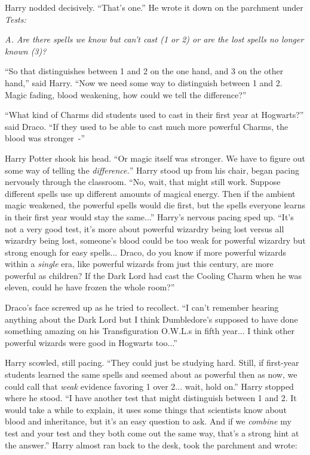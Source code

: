 Harry nodded decisively. ``That's one.'' He wrote it down on the parchment under \emph{Tests:}

\emph{A. Are there spells we know but can't cast (1 or 2) or are the lost spells no longer known (3)?}

``So that distinguishes between 1 and 2 on the one hand, and 3 on the other hand,'' said Harry. ``Now we need some way to distinguish between 1 and 2. Magic fading, blood weakening, how could we tell the difference?''

``What kind of Charms did students used to cast in their first year at Hogwarts?'' said Draco. ``If they used to be able to cast much more powerful Charms, the blood was stronger~-''

Harry Potter shook his head. ``Or magic itself was stronger. We have to figure out some way of telling the \emph{difference.}'' Harry stood up from his chair, began pacing nervously through the classroom. ``No, wait, that might still work. Suppose different spells use up different amounts of magical energy. Then if the ambient magic weakened, the powerful spells would die first, but the spells everyone learns in their first year would stay the same...'' Harry's nervous pacing sped up. ``It's not a very good test, it's more about powerful wizardry being lost versus all wizardry being lost, someone's blood could be too weak for powerful wizardry but strong enough for easy spells... Draco, do you know if more powerful wizards within a \emph{single} era, like powerful wizards from just this century, are more powerful as children? If the Dark Lord had cast the Cooling Charm when he was eleven, could he have frozen the whole room?''

Draco's face screwed up as he tried to recollect. ``I can't remember hearing anything about the Dark Lord but I think Dumbledore's supposed to have done something amazing on his Transfiguration O.W.L.s in fifth year... I think other powerful wizards were good in Hogwarts too...''

Harry scowled, still pacing. ``They could just be studying hard. Still, if first-year students learned the same spells and seemed about as powerful then as now, we could call that \emph{weak} evidence favoring 1 over 2... wait, hold on.'' Harry stopped where he stood. ``I have another test that might distinguish between 1 and 2. It would take a while to explain, it uses some things that scientists know about blood and inheritance, but it's an easy question to ask. And if we \emph{combine} my test and your test and they both come out the same way, that's a strong hint at the answer.'' Harry almost ran back to the desk, took the parchment and wrote:

